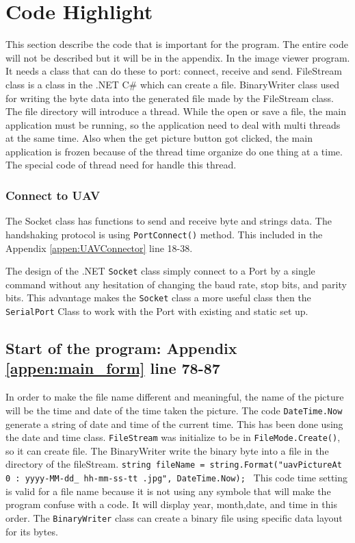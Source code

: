  
\section{Code Highlight}

This section describe the code that is important for the program. The entire code will not be described but it will be in the appendix. In the image viewer program. It needs a class that can do these to port: connect, receive and send. FileStream class is a class in the .NET C\# which can create a file. BinaryWriter class used for writing the byte data into the generated file made by the FileStream class. The file directory will introduce a thread. While the open or save a file, the main application must be running, so the application need to deal with multi threads at the same time. Also when the get picture button got clicked, the main application is frozen because of the thread time organize do one thing at a time. The special code of thread need for handle this thread. 

\subsubsection*{Connect to UAV}
The Socket class has functions to send and receive byte and strings data. The handshaking protocol is using \texttt{PortConnect()} method. This included in the Appendix \ref{appen:UAVConnector} line 18-38.  
        
	The design of the .NET \texttt{Socket} class simply connect to a Port by a single command without any hesitation of changing the baud rate, stop bits, and parity bits. 
	This advantage makes the \texttt{Socket} class a more useful class then the \texttt{SerialPort} Class to work with the Port with existing and static set up. 

\subsection{Start of the program: Appendix \ref{appen:main_form} line 78-87}%
In order to make the file name different and meaningful, the name of the picture will be the time and date of the time taken the picture. The code \texttt{DateTime.Now} generate a string of date and time of the current time. This has been done using the date and time class. \texttt{FileStream} was initialize to be in \texttt{FileMode.Create()}, so it can create file. The BinaryWriter write the binary byte into a file in the directory of the fileStream. \texttt{string fileName = string.Format("uavPictureAt{ 0 : yyyy-MM-dd\_ hh-mm-ss-tt}
 .jpg", DateTime.Now);   }  
This code time setting is valid for a file name because it is not using any symbole that will make the program confuse with a code. 
It will display year, month,date, and time in this order. 
The \texttt{BinaryWriter} class can create a binary file using specific data layout for its bytes. 


